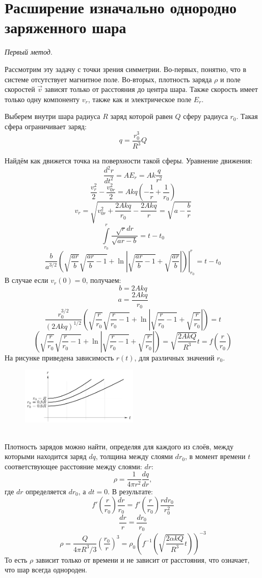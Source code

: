 \section{Расширение изначально однородно заряженного шара}

\textit{Первый метод}. 

Рассмотрим эту задачу с точки зрения симметрии. Во-первых, понятно, что в системе отсутствует магнитное поле. Во-вторых, плотность заряда $\rho$ и поле скоростей $\vec{v}$ зависят только от расстояния до центра шара. Также скорость имеет только одну компоненту $v_r$, также как и электрическое поле $E_r$.
 
Выберем внутри шара радиуса $R$ заряд которой равен $Q$ сферу радиуса $r_0$. Такая сфера ограничивает заряд:
\[
	q = \frac{r_0^3}{R^3} Q
\]

Найдём как движется точка на поверхности такой сферы. Уравнение движения:
\[
	\frac{d^2 r}{dt^2} = A E_r = A  k \frac{q}{r^2}
\]
\[
	\frac{v_r^2}{2} - \frac{v_{0r}^2}{2} = A k q \left(- \frac{1}{r} + \frac{1}{r_0}\right)
\]
\[
	v_r = \sqrt{v_{0r}^2 + \frac{2A kq}{r_0} - \frac{2A k q}{r}} = \sqrt{a - \frac{b}{r}}
\]
\[
	\int\limits_{r_0}^{r} 
	\frac{\sqrt{r} dr}{\sqrt{ar - b}}
	=
	t - t_0
\]
\[
	\frac{b}{a^{3/2}} 
	\left.
	\left(\sqrt{\frac{ar}{b}} \sqrt{\frac{ar}{b}-1} + 
	\ln \left|\sqrt{\frac{ar}{b} - 1} + \sqrt{\frac{ar}{b}}\right|\right) 
	\right|_{r_0}^{r}
	= t - t_0
\]
В случае если $v_{r}(0) = 0$, получаем:
\[
	b = 2A k q
\]
\[
	a = \frac{2A kq}{r_0}
\]
\[
	\frac{r_0^{3/2}}{(2A k q)^{1/2}} 
	\left(\sqrt{\frac{r}{r_0}} \sqrt{\frac{r}{r_0}-1} + 
	\ln \left|\sqrt{\frac{r}{r_0} - 1} + \sqrt{\frac{r}{r_0}}\right|\right)
	= t
\]
\[
	\left(\sqrt{\frac{r}{r_0}} \sqrt{\frac{r}{r_0}-1} + 
	\ln \left|\sqrt{\frac{r}{r_0} - 1} + \sqrt{\frac{r}{r_0}}\right|\right)
	= \sqrt{
		\frac{2A k Q}{R^{3}} } t = f\left(\frac{r}{r_0}\right)
\]
На рисунке приведена зависимость $r(t)$, для различных значений $r_0$.
\begin{figure}[h!]
	\centering
	\includegraphics[width=0.5\textwidth]{images/png/sphere1.png}
\end{figure}
\\
Плотность зарядов можно найти, определяя для каждого из слоёв, между которыми находится заряд $dq$, толщина между слоями $dr_0$, в момент времени $t$ соответствующее расстояние между слоями:
$dr$:
\[
\rho = \frac{1}{4\pi r^2} \frac{dq}{dr},
\]
где $dr$ определяется $dr_0$, а $dt = 0$. В результате:
\[
	f'\left(\frac{r}{r_0}\right) \frac{dr}{r_0} = f'\left(\frac{r}{r_0}\right) \frac{r dr_0}{r_0^2} 
\]
\[
	\frac{dr}{r} = \frac{dr_0}{r_0}
\]
\[
	\rho = \frac{Q}{4\pi R^3/3} \left(\frac{r_0}{r}\right)^3 = \rho_0 \left(f^{-1}\left(\sqrt{
		\frac{2\alpha k Q}{R^{3}} } t\right)\right)^{-3}
\]
То есть $\rho$ зависит только от времени и не зависит от расстояния, что означает, что шар всегда однороден.

